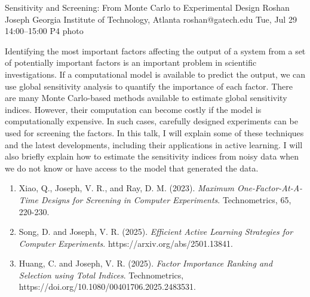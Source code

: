 \documentclass[12pt,lettersize,oneside]{book} %
\begin{document}
\clearpage
\begin{talk}
  {Sensitivity and Screening: From Monte Carlo to Experimental Design}%
  {Roshan Joseph}%
  {Georgia Institute of Technology, Atlanta}%
  {roshan@gatech.edu}%
  {}%
  {}%
  {Tue, Jul 29 14:00--15:00}%
  {P4}%
  {photo}%
  
    
   
Identifying the most important factors affecting the output of a system from a set of potentially important factors is an important problem in scientific investigations. If a computational model is available to predict the output, we can use global sensitivity analysis to quantify the importance of each factor. There are many Monte Carlo-based methods available to estimate global sensitivity indices. However, their computation can become costly if the model is computationally expensive. In such cases, carefully designed experiments can be used for screening the factors. In this talk, I will explain some of these techniques and the latest developments, including their applications in active learning. I will also briefly explain how to estimate the sensitivity indices from noisy data when we do not know or have access to the model that generated the data.
\medskip

\begin{enumerate}
 \item[{[1]}] Xiao, Q., Joseph, V. R., and Ray, D. M. (2023). {\it Maximum One-Factor-At-A-Time  Designs for Screening in Computer Experiments}. Technometrics, 65, 220-230.
    \item[{[2]}] Song, D. and Joseph, V. R. (2025). {\it Efficient Active Learning Strategies for Computer Experiments}. https://arxiv.org/abs/2501.13841.
 \item[{[3]}] Huang, C. and Joseph, V. R. (2025). {\it Factor Importance Ranking and Selection using Total Indices}. Technometrics, https://doi.org/10.1080/00401706.2025.2483531.
\end{enumerate}

\end{talk}
\end{document}
